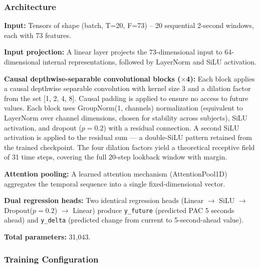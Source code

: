 \documentclass[11pt,letterpaper]{article}
\begin{document}
\subsubsection{Architecture}

\textbf{Input:} Tensors of shape (batch, T=20, F=73) -- 20 sequential 2-second windows, each with 73 features.

\textbf{Input projection:} A linear layer projects the 73-dimensional input to 64-dimensional internal representations, followed by LayerNorm and SiLU activation.

\textbf{Causal depthwise-separable convolutional blocks ($\times$4):} Each block applies a causal depthwise separable convolution with kernel size 3 and a dilation factor from the set [1, 2, 4, 8]. Causal padding is applied to ensure no access to future values. Each block uses GroupNorm(1, channels) normalization (equivalent to LayerNorm over channel dimensions, chosen for stability across subjects), SiLU activation, and dropout ($p = 0.2$) with a residual connection. A second SiLU activation is applied to the residual sum --- a double-SiLU pattern retained from the trained checkpoint. The four dilation factors yield a theoretical receptive field of 31 time steps, covering the full 20-step lookback window with margin.

\textbf{Attention pooling:} A learned attention mechanism (AttentionPool1D) aggregates the temporal sequence into a single fixed-dimensional vector.

\textbf{Dual regression heads:} Two identical regression heads (Linear $\to$ SiLU $\to$ Dropout($p = 0.2$) $\to$ Linear) produce \texttt{y\_future} (predicted PAC 5 seconds ahead) and \texttt{y\_delta} (predicted change from current to 5-second-ahead value).

\textbf{Total parameters:} 31,043.

\subsubsection{Training Configuration}
\end{document}
